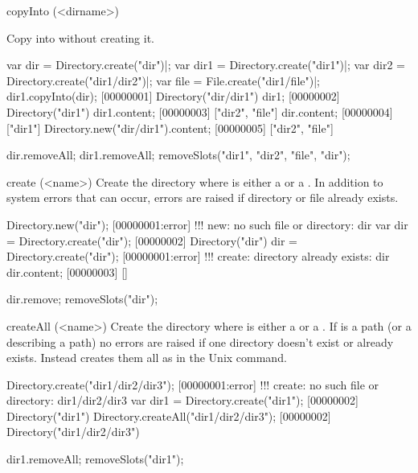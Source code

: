 \begin{urbiscriptapi}
\item[copyInto](<dirname>)
  \experimental{}

  Copy \this into  without creating it.
\begin{urbiscript}
var dir = Directory.create("dir")|;
var dir1 = Directory.create("dir1")|;
var dir2 = Directory.create("dir1/dir2")|;
var file = File.create("dir1/file")|;
dir1.copyInto(dir);
[00000001] Directory("dir/dir1")
dir1;
[00000002] Directory("dir1")
dir1.content;
[00000003] ["dir2", "file"]
dir.content;
[00000004] ["dir1"]
Directory.new("dir/dir1").content;
[00000005] ["dir2", "file"]
\end{urbiscript}
\begin{urbicomment}
dir.removeAll;
dir1.removeAll;
removeSlots("dir1", "dir2", "file", "dir");
\end{urbicomment}


\item[create](<name>)
  Create the directory  where  is either a
   or a . In addition to system errors that
  can occur, errors are raised if directory or file  already exists.
\begin{urbiscript}
Directory.new("dir");
[00000001:error] !!! new: no such file or directory: dir
var dir = Directory.create("dir");
[00000002] Directory("dir")
dir = Directory.create("dir");
[00000001:error] !!! create: directory already exists: dir
dir.content;
[00000003] []
\end{urbiscript}
\begin{urbicomment}
dir.remove;
removeSlots("dir");
\end{urbicomment}


\item[createAll](<name>)
  Create the directory  where  is either a
   or a . If  is a
  path (or a  describing a path) no errors are
  raised if one directory doesn't exist or already exists. Instead
   creates them all as in the Unix  command.
\begin{urbiscript}
Directory.create("dir1/dir2/dir3");
[00000001:error] !!! create: no such file or directory: dir1/dir2/dir3
var dir1 = Directory.create("dir1");
[00000002] Directory("dir1")
Directory.createAll("dir1/dir2/dir3");
[00000002] Directory("dir1/dir2/dir3")
\end{urbiscript}
\begin{urbicomment}
dir1.removeAll;
removeSlots("dir1");
\end{urbicomment}



\end{urbiscriptapi}
